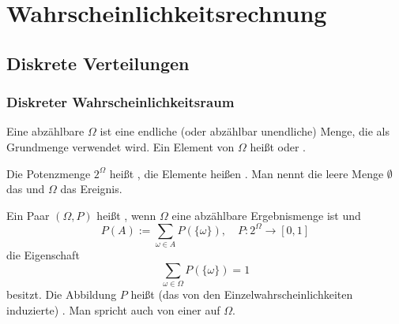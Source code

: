 
\chapter{Wahrscheinlichkeitsrechnung}

\section{Diskrete Verteilungen}

\subsection{Diskreter Wahrscheinlichkeitsraum}

\begin{definition}%
%
Eine abzählbare  $\Omega$ ist eine endliche
(oder abzählbar unendliche) Menge, die als Grundmenge verwendet wird.
Ein Element von $\Omega$ heißt  oder
.

Die Potenzmenge $2^\Omega$ heißt , die
Elemente heißen .
Man nennt die leere Menge $\emptyset$ das  und $\Omega$
das  Ereignis.
\end{definition}

\begin{definition}%
%
Ein Paar $(\Omega,P)$ heißt , wenn
$\Omega$ eine abzählbare Ergebnismenge ist und%
\begin{equation}
P(A):=\sum_{\omega\in A} P(\{\omega\}),\quad P\colon 2^\Omega\to [0,1]
\end{equation}
die Eigenschaft
\begin{equation}
\sum_{\omega\in\Omega} P(\{\omega\})=1
\end{equation}
besitzt. Die Abbildung $P$ heißt (das von den
Einzelwahrscheinlichkeiten induzierte) .
Man spricht auch von einer  auf $\Omega$.
\end{definition}


